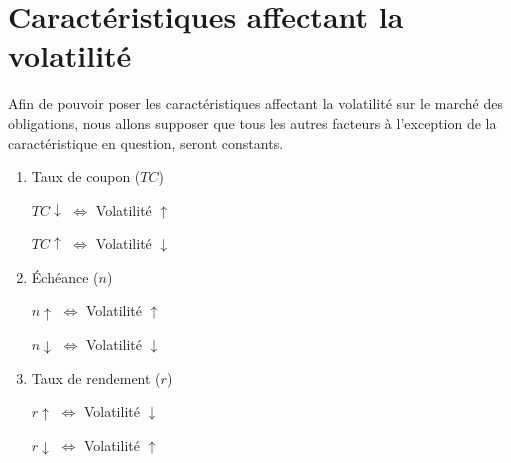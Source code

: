 \documentclass[letterpaper, 12pt]{article}
\newcommand{\1}{\mathds{1}}	%
\theoremstyle{definition}
\begin{document}
\section{Caractéristiques affectant la volatilité}
Afin de pouvoir poser les caractéristiques affectant la volatilité sur le marché des obligations, nous allons supposer que tous les autres facteurs à l'exception de la caractéristique en question, seront constants. 
\begin{enumerate}
\item Taux de coupon ($TC$)
\begin{center}
$TC \downarrow$ \hspace{1cm} $\Longleftrightarrow$  \hspace{1cm} Volatilité $\uparrow$
\end{center}
\begin{center}
$TC \uparrow$ \hspace{1cm} $\Longleftrightarrow$  \hspace{1cm} Volatilité $\downarrow$
\end{center}
\item Échéance ($n$)
\begin{center}
$n \uparrow$ \hspace{1cm} $\Longleftrightarrow$  \hspace{1cm} Volatilité $\uparrow$
\end{center}
\begin{center}
$n \downarrow$ \hspace{1cm} $\Longleftrightarrow$  \hspace{1cm} Volatilité $\downarrow$
\end{center}
\item Taux de rendement ($r$)
\begin{center}
$r \uparrow$ \hspace{1cm} $\Longleftrightarrow$  \hspace{1cm} Volatilité $\downarrow$
\end{center}
\begin{center}
$r \downarrow$ \hspace{1cm} $\Longleftrightarrow$  \hspace{1cm} Volatilité $\uparrow$
\end{center}
\end{enumerate}
\end{document}
